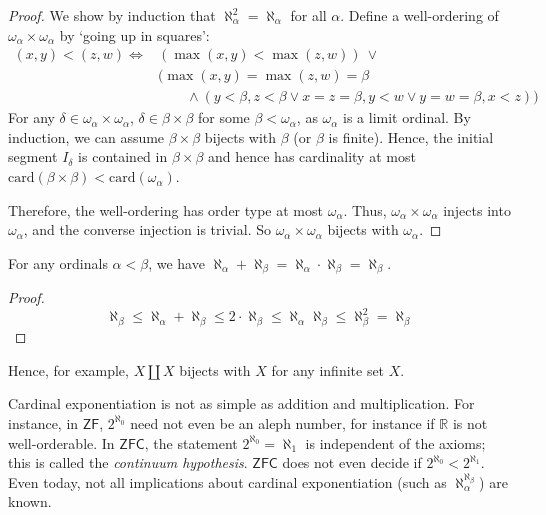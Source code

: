\begin{proof}
    We show by induction that \( \aleph_\alpha^2 = \aleph_\alpha \) for all \( \alpha \).
    Define a well-ordering of \( \omega_\alpha \times \omega_\alpha \) by `going up in squares':
    \begin{align*}
        (x,y) < (z,w) \iff &(\max(x,y) < \max(z,w)) \ \vee \\
        &(\max(x,y) = \max(z,w) = \beta \\
        &\quad\quad\wedge (y < \beta, z < \beta \vee x = z = \beta, y < w \vee y = w = \beta, x < z))
    \end{align*}
    For any \( \delta \in \omega_\alpha \times \omega_\alpha \), \( \delta \in \beta \times \beta \) for some \( \beta < \omega_\alpha \), as \( \omega_\alpha \) is a limit ordinal.
    By induction, we can assume \( \beta \times \beta \) bijects with \( \beta \) (or \( \beta \) is finite).
    Hence, the initial segment \( I_\delta \) is contained in \( \beta \times \beta \) and hence has cardinality at most \( \mathrm{card}(\beta \times \beta) < \mathrm{card}(\omega_\alpha) \).

    Therefore, the well-ordering has order type at most \( \omega_\alpha \).
    Thus, \( \omega_\alpha \times \omega_\alpha \) injects into \( \omega_\alpha \), and the converse injection is trivial.
    So \( \omega_\alpha \times \omega_\alpha \) bijects with \( \omega_\alpha \).
\end{proof}
\begin{corollary}
    For any ordinals \( \alpha < \beta \), we have \( \aleph_\alpha + \aleph_\beta = \aleph_\alpha \cdot \aleph_\beta = \aleph_\beta \).
\end{corollary}
\begin{proof}
    \[ \aleph_\beta \leq \aleph_\alpha + \aleph_\beta \leq 2 \cdot \aleph_\beta \leq \aleph_\alpha \aleph_\beta \leq \aleph_\beta^2 = \aleph_\beta \]
\end{proof}
Hence, for example, \( X \amalg X \) bijects with \( X \) for any infinite set \( X \).

Cardinal exponentiation is not as simple as addition and multiplication.
For instance, in \( \mathsf{ZF} \), \( 2^{\aleph_0} \) need not even be an aleph number, for instance if \( \mathbb R \) is not well-orderable.
In \( \mathsf{ZFC} \), the statement \( 2^{\aleph_0} = \aleph_1 \) is independent of the axioms; this is called the \emph{continuum hypothesis}.
\( \mathsf{ZFC} \) does not even decide if \( 2^{\aleph_0} < 2^{\aleph_1} \).
Even today, not all implications about cardinal exponentiation (such as \( \aleph_\alpha^{\aleph_\beta} \)) are known.
